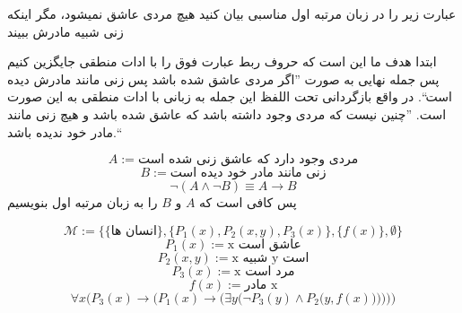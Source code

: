 عبارت زیر را در زبان مرتبه اول مناسبی بیان کنید
هیچ مردی عاشق نمیشود، مگر اینکه زنی شبیه مادرش ببیند
\begin{ans}
	ابتدا هدف ما این است که حروف ربط عبارت فوق را با ادات منطقی جایگزین کنیم پس جمله نهایی به صورت ''اگر مردی عاشق شده باشد پس زنی مانند مادرش دیده است``. در واقع بازگردانی تحت اللفظ این جمله به زبانی با ادات منطقی به این صورت است. ''چنین نیست که مردی وجود داشته باشد که عاشق شده باشد و هیچ زنی مانند مادر خود ندیده باشد.``
	
		$$
		A := \text{مردی وجود دارد که عاشق زنی شده است}
		$$
		$$
		B := \text{زنی مانند مادر خود دیده است}
		$$
		$$
		\neg (A \wedge \neg B) \equiv A \rightarrow {B}
		$$
		پس کافی است که $A$ و $B$ را به زبان مرتبه اول بنویسیم	
		
		$$
			\mathcal{M} := \{\{\text{انسان ها}\}, \{P_1(x), P_2(x, y), P_3(x)\}, \{f(x)\}, \emptyset\}
		$$
		$$
			{P_1}(x) := \text{x عاشق است}
		$$
		$$
			{P_2}(x, y) := \text{x شبیه y است}
		$$
		$$
			{P_3}(x) := \text{x مرد است}
		$$
		$$
			f(x) := \text{مادر x}
		$$
		$$
			\forall x \Big({P_3}(x) \rightarrow \Big({{P_1}(x) \rightarrow \Big({\exists y \Big(\neg {P_3}(y) \wedge {P_2}\Big(y, f(x)\Big)\Big)}}\Big)  \Big)\Big)
		$$
		
	
\end{ans}
